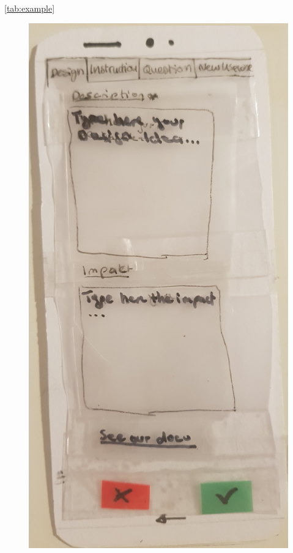 \autoref{tab:example} 
\begin{figure}[H]
	\label{tab:example}
	\centering
	\begin{minipage}{.5\textwidth}
		\centering
		\includegraphics[width=.8\linewidth]{resources/conception/lowfi_form.jpg}
		\label{fig:test1}
	\end{minipage}%
	\begin{minipage}{.5\textwidth}
		\centering

\end{minipage}
\end{figure}
